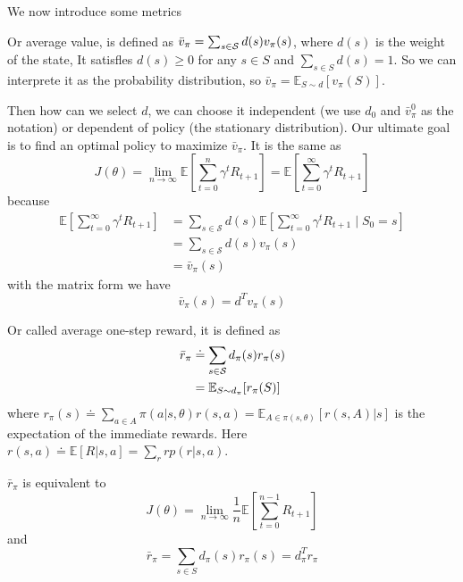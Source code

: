 \documentclass[10pt]{elegantbook}
\begin{document}
We now introduce some metrics
\begin{definition}
    Or average value, is defined as $\bar{v}_{\pi}=\sum_{s\in{\cal S}}d(s)v_{\pi}(s)$, where $d(s)$ is the weight
    of the state, It satisfles $d(s)\geq0$ for any $s\in S$ and $\sum_{s\in S}d(s)=1$. So we can interprete it as the probability distribution, so 
    $\bar{v}_{\pi}=\mathbb{E}_{S\sim d}[v_{\pi}(S)]$.

    Then how can we select $d$, we can choose it independent (we use $d_0$ and $\bar v_{\pi}^0$ as the notation) or dependent of policy (the stationary 
    distribution). Our ultimate goal is to find an optimal policy to maximize $\bar{v}_{\pi}$. It is the same as 
    \[ J(\theta)=\lim_{n\rightarrow\infty}\mathbb{E}\left[\sum_{t=0}^{n}\gamma^{t}R_{t+1}\right]=\mathbb{E}\left[\sum_{t=0}^{\infty}\gamma^{t}R_{t+1}\right] \]
    because
    \begin{align*}
        \mathbb{E}\left[\sum_{t=0}^{\infty}\gamma^{t}R_{t+1}\right] &= \sum_{s \in \mathcal S}d(s) \mathbb{E}\left[\sum_{t=0}^{\infty}\gamma^{t}R_{t+1} \mid S_0 = s \right] \\
        &= \sum_{s \in \mathcal S}d(s) v_{\pi}(s) \\
        &= \bar v_{\pi}(s)
    \end{align*}
    with the matrix form we have
    \[ \bar v_{\pi}(s) = d^T v_{\pi}(s) \]
\end{definition}

\begin{definition}
    Or called average one-step reward, it is defined as
    \begin{align*}
        \bar{r}_{\pi} &\doteq \sum_{s\in{\cal S}}d_{\pi}(s)r_{\pi}(s) \\
        &= \mathbb E_{S\sim d_{\pi}}[r_{\pi}({S})]
    \end{align*}
    where $r_{\pi}(s)\doteq\sum_{a\in A}\pi(a|s,\theta)r(s,a)=\mathbb{E}_{A \in \pi(s,\theta)}[r(s,A)|s]$ is the expectation of the immediate rewards.
    Here $r(s,a)\doteq\mathbb{E}[R|s,a]=\sum_{r}r p(r|s,a)$.

    $\bar r_{\pi}$ is equivalent to
    \[ J(\theta)=\operatorname*{lim}_{n\rightarrow\infty}\frac{1}{n}  \mathbb E \left[\sum_{t=0}^{n-1}R_{t+1}\right] \]
    and
    \[ \bar{r}_{\pi}=\sum_{s\in S}d_{\pi}(s)r_{\pi}(s)=d_{\pi}^{T}r_{\pi} \]
\end{definition}
\end{document}
